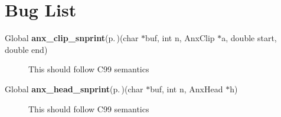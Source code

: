 \section{Bug List}\label{bug}
\label{_bug000002}
 \begin{description}
\item[Global {\bf anx\_\-clip\_\-snprint}{\rm (p.\,\pageref{anx__general_8h_a20})}(char $\ast$buf, int n, Anx\-Clip $\ast$a, double start, double end) ]This should follow C99 semantics \end{description}


\label{_bug000001}
 \begin{description}
\item[Global {\bf anx\_\-head\_\-snprint}{\rm (p.\,\pageref{anx__general_8h_a19})}(char $\ast$buf, int n, Anx\-Head $\ast$h) ]This should follow C99 semantics \end{description}
